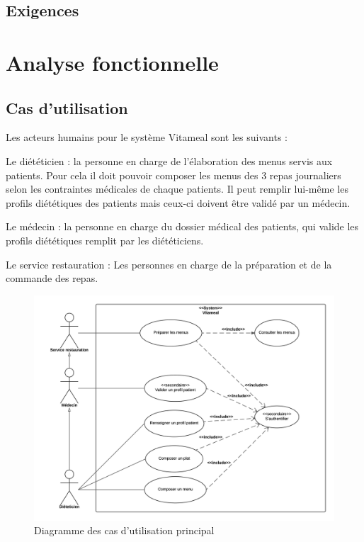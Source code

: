 \subsection{Exigences}



\section{Analyse fonctionnelle}

\subsection{Cas d'utilisation}

Les acteurs humains pour le système Vitameal sont les suivants :

Le diététicien : la personne en charge de l'élaboration des menus servis aux patients. Pour cela il doit pouvoir composer les menus des 3 repas journaliers selon les contraintes médicales de chaque patients. Il peut remplir lui-même les profils diététiques des patients mais ceux-ci doivent être validé par un médecin.

Le médecin : la personne en charge du dossier médical des patients, qui valide les profils diététiques remplit par les diététiciens.
 
Le service restauration : Les personnes en charge de la préparation et de la commande des repas.

\begin{figure}[H]
\centering
\includegraphics[scale=0.8]{../../CasDUtilisations/diagramme_cas_utilisation.png}
\caption{Diagramme des cas d'utilisation principal}
\end{figure}

